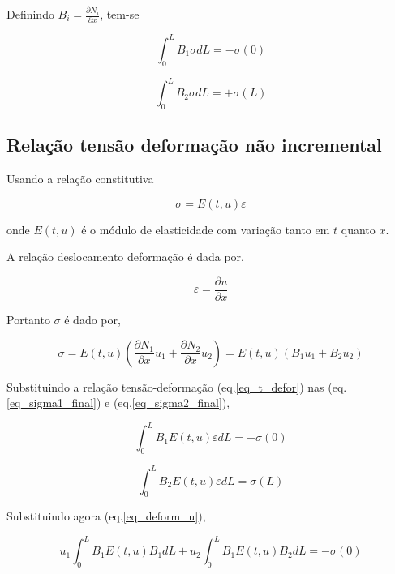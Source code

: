 \documentclass[12pt,a4paper]{article}
\newcommand{\diff}[1]{d#1}
\newcommand{\dd}[2]{\frac{\partial #1}{\partial #2}}
\begin{document}
Definindo $B_i = \dd{N_i}{x}$, tem-se

\begin{equation}
\int_0^L B_1\sigma \diff{L}  = -\sigma\left(0\right)
\label{eq_sigma1_final}
\end{equation}

\begin{equation}
\int_0^L B_2\sigma \diff{L}  = + \sigma\left(L\right)
\label{eq_sigma2_final}
\end{equation}
 
 
\subsection{Relação tensão deformação não incremental}

Usando a relação constitutiva 

\begin{equation}
\sigma = E\left(t,u\right) \varepsilon  
\label{eq_t_defor}
\end{equation}
 
\noindent
onde $E\left(t,u\right)$ é o módulo de elasticidade com variação tanto em $t$ quanto $x$.

A relação deslocamento deformação é dada por,

\begin{equation}
\varepsilon  = \dd{u}{x}
\end{equation}

Portanto $\sigma$ é dado por,

\begin{equation}
\sigma = E\left(t,u\right) \left(\dd{N_1}{x}u_1 + \dd{N_2}{x}u_2\right) = E\left(t,u\right) \left(B_1 u_1 + B_2 u_2\right)   
\label{eq_deform_u}
\end{equation}

Substituindo a relação tensão-deformação (eq.\ref{eq_t_defor}) nas  (eq.\ref{eq_sigma1_final}) e (eq.\ref{eq_sigma2_final}), 

\begin{equation}
\int_0^L B_1E \left(t,u\right) \varepsilon \diff{L} = - \sigma\left(0\right)
\end{equation}

\begin{equation}
\int_0^L B_2E\left(t,u\right) \varepsilon \diff{L}  = \sigma\left(L\right)
\end{equation}

Substituindo agora (eq.\ref{eq_deform_u}),

\begin{equation}
u_1 \int_0^L B_1E \left(t,u\right) B_1 \diff{L} + u_2 \int_0^L B_1E \left(t,u\right) B_2 \diff{L} = - \sigma\left(0\right)
\end{equation}
\end{document}
